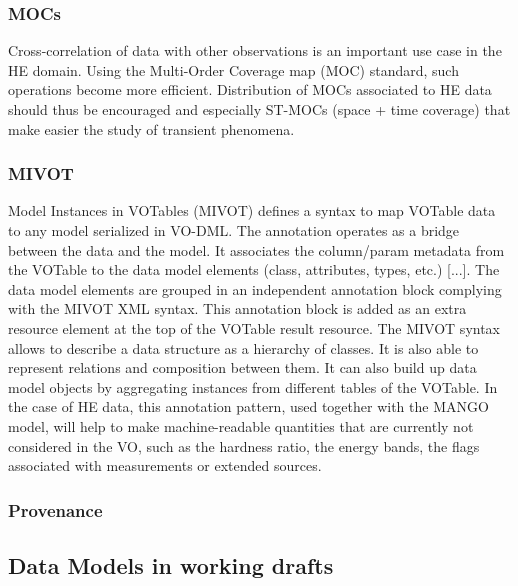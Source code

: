\documentclass[11pt,a4paper]{ivoa}
\begin{document}
\subsubsection{MOCs}

Cross-correlation of data with other observations is an important use case in the HE domain. Using the Multi-Order Coverage map (MOC) standard, such operations become more efficient. Distribution of MOCs associated to HE data should thus be encouraged and especially ST-MOCs (space + time coverage)
that make easier the study of transient phenomena.

\subsubsection{MIVOT}

Model Instances in VOTables (MIVOT) defines a syntax to map VOTable data to any model serialized in VO-DML. The annotation operates as a bridge between the data and the model. It associates the column/param metadata from the VOTable to the data model elements (class, attributes, types, etc.) [...]. The data model elements are grouped in an independent annotation block complying with the MIVOT XML syntax. This annotation block is added as an extra resource element at the top of the VOTable result resource. The MIVOT syntax allows to describe a data structure as a hierarchy of classes. It is also able to represent relations and composition between them. It can also build up data model objects by aggregating instances from different tables of the VOTable.
In the case of HE data, this annotation pattern, used together with the MANGO model, will help to make machine-readable quantities that are currently not considered in the VO, such as the hardness ratio, the energy bands, the flags associated with measurements or  extended sources.




\subsubsection{Provenance}



\subsection{Data Models in working drafts}
\end{document}

